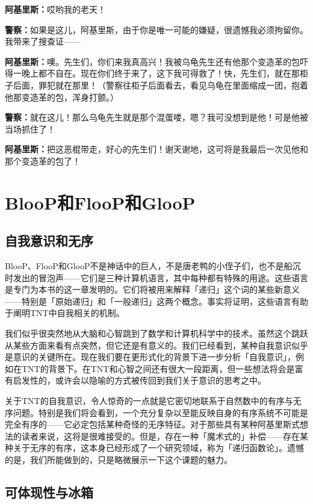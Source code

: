 \documentclass[
  12pt,
  twoside,
  openright,
  oldfontcommands,
]{memoir}
\newcommand{\kaitismall}[1]{{\kaitifamily\small #1}}
\newcommand{\dialogname}[1]{{\heifamily\bfseries #1}}
\begin{document}
\dialogname{阿基里斯：}哎哟我的老天！

\dialogname{警察：}如果是这儿，阿基里斯，由于你是唯一可能的嫌疑，很遗憾我必须拘留你。我带来了搜查证------

\dialogname{阿基里斯：}噢。先生们，你们来我真高兴！我被乌龟先生还有他那个变造革的包吓得一晚上都不自在。现在你们终于来了，这下我可得救了！快，先生们，就在那柜子后面，罪犯就在那里！\kaitismall{（警察往柜子后面看去，看见乌龟在里面缩成一团，抱着他那变造革的包，浑身打颤。）}

\dialogname{警察：}就在这儿！那么乌龟先生就是那个混蛋喽，嗯？我可没想到是他！可是他被当场抓住了！

\dialogname{阿基里斯：}把这恶棍带走，好心的先生们！谢天谢地，这可将是我最后一次见他和那个变造革的包了！

\label{Chapter13.xhtml}{}

\chapter{BlooP和FlooP和GlooP}

\section{自我意识和无序}

BlooP、FlooP和GlooP不是神话中的巨人，不是唐老鸭的小侄子们，也不是船沉时发出的冒泡声------它们是三种计算机语言，其中每种都有特殊的用途。这些语言是专门为本书的这一章发明的。它们将被用来解释「递归」这个词的某些新意义------特别是「原始递归」和「一般递归」这两个概念。事实将证明，这些语言有助于阐明TNT中自我相关的机制。

我们似乎很突然地从大脑和心智跳到了数学和计算机科学中的技术。虽然这个跳跃从某些方面来看有点突然，但它还是有意义的。我们已经看到，某种自我意识似乎是意识的关键所在。现在我们要在更形式化的背景下进一步分析「自我意识」，例如在TNT的背景下。在TNT和心智之间还有很大一段距离，但一些想法将会是富有启发性的，或许会以隐喻的方式被传回到我们关于意识的思考之中。

关于TNT的自我意识，令人惊奇的一点就是它密切地联系于自然数中的有序与无序问题。特别是我们将会看到，一个充分复杂以至能反映自身的有序系统不可能是完全有序的------它必定包括某种奇怪的无序特征。对于那些具有某种阿基里斯式想法的读者来说，这将是很难接受的。但是，存在一种「魔术式的」补偿------存在某种关于无序的有序，这本身已经形成了一个研究领域，称为「递归函数论」。遗憾的是，我们所能做到的，只是略微展示一下这个课题的魅力。

\section{可体现性与冰箱}
\end{document}
